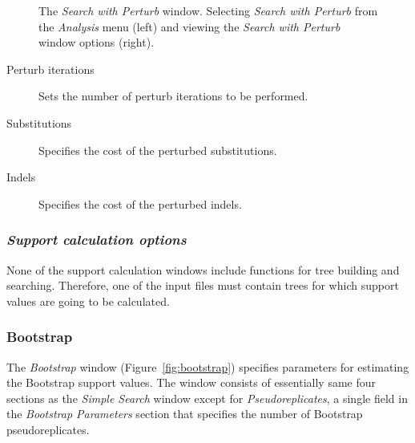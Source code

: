 \begin{figure}
\begin{minipage}[c]{0.48\textwidth}
   	\end{minipage} 
\caption{The \emph{Search with Perturb} window. Selecting \emph{Search with Perturb} from the \emph{Analysis} menu (left) and viewing the \emph{Search with Perturb} window options (right).}
\label{fig:search_with_perturb_window}
\end{figure}

\begin{description}
    \item[Perturb iterations] Sets the number of perturb iterations to be performed.
    \item[Substitutions] Specifies the cost of the perturbed substitutions.
    \item[Indels] Specifies the cost of the perturbed indels.
\end{description}

\subsubsection{\emph{Support calculation options}}

None of the support calculation windows include functions for tree building and searching. Therefore, one of the input files must contain trees for which support values are going to be calculated.

\subsubsection{Bootstrap}

The \emph{Bootstrap} window (Figure~\ref{fig:bootstrap}) specifies parameters
for estimating the Bootstrap support values. The window consists
of essentially same four sections as the \emph{Simple Search} window
except for \emph{Pseudoreplicates}, a single field in the \emph{Bootstrap Parameters} section that specifies the number of Bootstrap pseudoreplicates.

